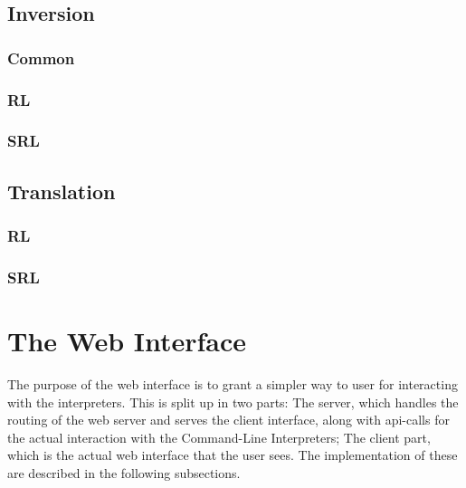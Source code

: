 \subsection*{Inversion}
%

\subsubsection*{Common}
%

\subsubsection*{RL}
%

\subsubsection*{SRL}
%

\subsection*{Translation}
%

\subsubsection*{RL}
%

\subsubsection*{SRL}
%




\section*{The Web Interface}
%

The purpose of the web interface is to grant a simpler way to user for interacting with the interpreters.
This is split up in two parts:
The server, which handles the routing of the web server and serves the client interface, along with api-calls for the actual interaction with the Command-Line Interpreters;
The client part, which is the actual web interface that the user sees.
The implementation of these are described in the following subsections.

